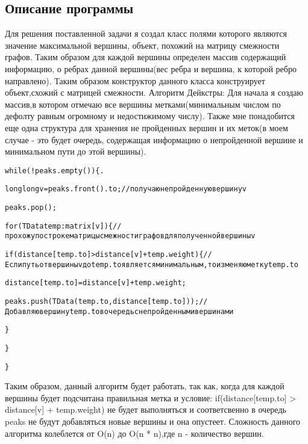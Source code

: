 \documentclass[12pt]{article}
\begin{document}
\subsection*{Описание программы}
Для решения поставленной задачи я создал класс полями которого являются значение максимальной вершины, объект, похожий на матрицу смежности графов. Таким образом для каждой вершины определен массив содержащий информацию, о ребрах данной вершины(вес ребра и вершина, к которой ребро направлено). Таким образом конструктор данного класса конструирует объект,схожий с матрицей смежности. \newline
Алгоритм Дейкстры: Для начала я создаю массив,в котором отмечаю все вершины метками(минимальным числом по дефолту равным огромному и недостижимому числу). Также мне понадобится еще одна структура для хранения не пройденных вершин и их меток(в моем случае - это будет очередь, содержащая информацию о непройденной вершине и минимальном пути до этой вершины). 
\newline
\begin{alltt}
while(!peaks.empty()) \{ . 

        \quad    long long v = peaks.front().to; // получаю не пройденную вершину v
        
        \quad    peaks.pop();
        
       \quad\quad     for(TData temp : matrix[v]) \{ // прохожу по строке матрицы смежности графов для полученной вершины v
       
    \quad\quad\quad  if(distance[temp.to] > distance[v] + temp.weight) \{ // Если путь от вершины v до temp.to является минимальным, то изменяю метку temp.to 
                
      \quad\quad\quad\quad  distance[temp.to] = distance[v] + temp.weight;
                    
       \quad\quad\quad\quad peaks.push(TData(temp.to,distance[temp.to])); // Добавляю вершину temp.to  в очередь с непройденными вершинами
                    
     \quad\quad         \}
                
   \quad       \}
            
 \}
\end{alltt}\newline
Таким образом, данный алгоритм будет работать, так как,  когда для каждой вершины будет подсчитана правильная метка и условие: if(distance[temp.to] > distance[v] + temp.weight) не будет выполняться и соответсвенно в очередь peaks не будут добавляться новые вершины и она опустеет. Сложность данного алгоритма колеблется от O(n) до O(n * n),где n - количество вершин.
\end{document}
